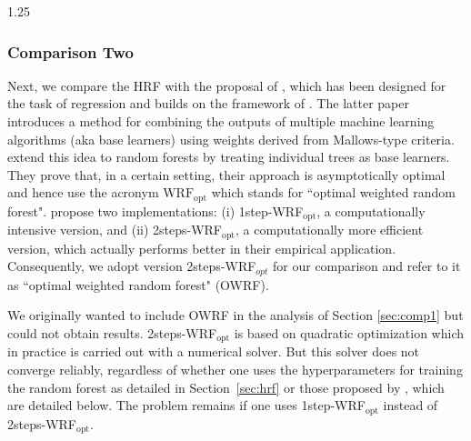 \documentclass[12pt]{article}
\numberwithin{equation}{section}
\theoremstyle{plain}
\begin{document}
\begin{spacing}{1.25}
\subsubsection{Comparison Two}

Next, we compare the HRF with  the proposal of
\cite{chen:yu:zhang:2024}, which has been designed for the task of regression and builds on the framework of \cite{qiu:xie:zhang:2020}.
The latter paper introduces a method for combining the outputs of multiple machine learning algorithms (aka base learners) using weights derived from Mallows-type criteria. \cite{chen:yu:zhang:2024} extend this idea to random forests by treating individual trees as base learners. They prove that, in a certain setting, their approach is asymptotically optimal 
and hence use the acronym $\mbox{WRF}_{\text{opt}}$ which stands 
for ``optimal weighted random forest". 
\cite{chen:yu:zhang:2024} propose two implementations: (i) 1step-WRF\(_{\text{opt}}\), a computationally intensive version, and (ii) 2steps-WRF\(_{\text{opt}}\), a computationally more efficient version, which actually performs better in their empirical application. Consequently, we adopt version 2steps-WRF\(_{opt}\) for our comparison and refer to it as ``optimal weighted random forest" (OWRF).  

We originally wanted to include OWRF in the analysis of Section \ref{sec:comp1} but could not obtain results. 2steps-WRF\(_{\text{opt}}\) is based on quadratic optimization which in practice is carried out with a numerical solver. But this solver does not converge reliably, regardless of whether one uses the hyperparameters for training the random forest as detailed in Section~\ref{sec:hrf} or those proposed by \cite{chen:yu:zhang:2024}, which are detailed below.
The problem remains if one uses 1step-WRF\(_{\text{opt}}\)
instead of 2steps-WRF\(_{\text{opt}}\).


\end{spacing}
\end{document}
